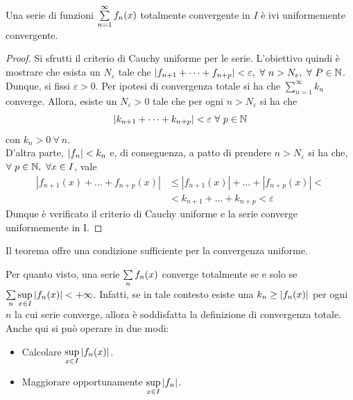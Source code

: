 \begin{theorem} \label{Teo: Criterio di Weierstrass (convergenza totale)}
Una serie di funzioni $\sum\limits_{n=1}^{\infty}{f_n(x)}$ totalmente convergente in $I$ è ivi uniformemente convergente.
\end{theorem}
\begin{proof}
    Si sfrutti il criterio di Cauchy uniforme per le serie. L'obiettivo quindi è mostrare che esista un $N_\varepsilon$ tale che $|f_{n+1}+ \dots+ f_{n+p}|< \varepsilon,\ \forall\ n > N_\varepsilon,\ \forall\ P\in \mathbb{N}$.\\
    Dunque, si fissi $\varepsilon>0$. Per ipotesi di convergenza totale si ha che $\sum\limits_{n=1}^{\infty}{k_n}$ converge. Allora, esiste un $N_\varepsilon>0$ tale che per ogni $n>N_\varepsilon$ si ha che 
    \begin{equation}
        |k_{n+1}+\dots+k_{n+p}|< \varepsilon\ \forall\ p \in \mathbb{N}
    \end{equation}
   con $k_n>0\ \forall\ n$.\\
   D'altra parte, $|f_n|<k_n$ e, di conseguenza, a patto di prendere $n> N_\varepsilon$ si ha che, $\forall\ p \in \mathbb{N},\ \forall x \in I$, vale
    \begin{equation}
    \begin{aligned}
        |f_{n+1}(x)+ \dots + f_{n+p}(x)| &\leq |f_{n+1}(x)|+ \dots + |f_{n+p}(x)|<\\ 
        &< k_{n+1}+ \dots + k_{n+p} < \varepsilon
    \end{aligned}
    \end{equation}
    Dunque è verificato il criterio di Cauchy uniforme e la serie converge uniformemente in I.
\end{proof}
\begin{oss}
    Il teorema offre una condizione sufficiente per la convergenza uniforme.
\end{oss}
\begin{oss}
Per quanto visto, una serie $\sum\limits_{n}{f_n(x)}$ converge totalmente se e solo se $\sum\limits_{n}{\sup\limits_{x \in I}{|f_n(x)|}} < +\infty$. Infatti, se in tale contesto esiste una $k_n \geq |f_n(x)|$ per ogni $n$ la cui serie converge, allora è soddisfatta la definizione di convergenza totale.\\
Anche qui si può operare in due modi:
\begin{itemize}
    \item Calcolare $\sup\limits_{x \in I}{|f_n(x)|}$.
    \item Maggiorare opportunamente $\sup\limits_{x \in I}{|f_n|}$.
\end{itemize}
\end{oss}
